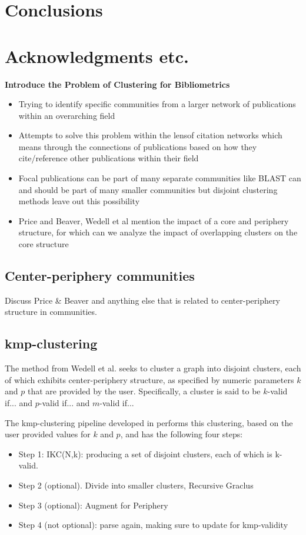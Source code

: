 \documentclass{article}
\begin{document}
\section{Conclusions}
\section{Acknowledgments etc.}


\textbf{ Introduce the Problem of Clustering for Bibliometrics}
\begin{itemize}
	\item Trying to identify specific communities from a larger network of publications within an overarching field
	\item Attempts to solve this problem within the lensof citation networks which means through the connections of publications based on how they cite/reference other publications within their field
	\item Focal publications can be part of many separate communities like BLAST can and should be part of many smaller communities but disjoint clustering methods leave out this possibility 
	\item Price and Beaver, Wedell et al mention the impact of a core and periphery structure, for which can we analyze the impact of overlapping clusters on the core structure
 \end{itemize}
 
 
\subsection{Center-periphery communities}

Discuss Price \& Beaver \cite{price_1966} and anything else that is related to center-periphery structure in communities.

\subsection{kmp-clustering }

The method from Wedell et al. \cite{wedell2022center} seeks to  cluster a graph into disjoint clusters, each of which 
exhibits center-periphery structure, as specified by numeric parameters $k$ and $p$ that are provided by the user.
Specifically, a cluster is said to be $k$-valid if... and $p$-valid if... and $m$-valid if...


The kmp-clustering pipeline developed in \cite{wedell2022center}  performs this clustering, based on the user provided values for $k$ and $p$, and has the following four steps: 
\begin{itemize}
	\item Step 1: IKC(N,k): producing a set of disjoint clusters, each of which is k-valid.
	\item Step 2 (optional). Divide into smaller clusters, Recursive Graclus
	\item Step 3 (optional): Augment for Periphery
	\item Step 4 (not optional): parse again, making sure to update for kmp-validity
\end{itemize}
\end{document}
